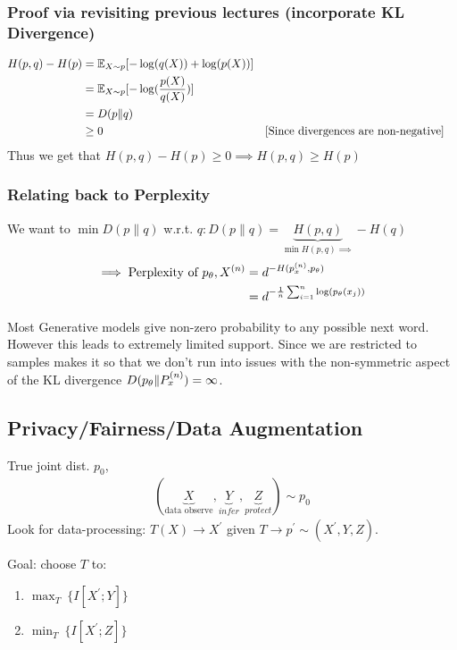 \subsubsection{Proof via revisiting previous lectures (incorporate KL Divergence)}
\begin{align*}
    H(p, q) - H(p) 
    &= \mathbb{E}_{X\sim p}[-\log(q(X)) + \log(p(X))]
    \\
    &= \mathbb{E}_{X\sim p}[-\log(\frac{p(X)}{q(X)})]
    \\
    &= D(p\| q)
    \\
    &\geq0 &&[\text{Since divergences are non-negative}]
\end{align*}
Thus we get that 
$    H(p, q) - H(p) 
\geq 0 \implies
    H(p, q) \geq H(p) 
$
\subsubsection{Relating back to Perplexity}
We want to $\min D(p\|q)$ w.r.t. $q: D(p\| q)=\underbrace{H(p, q)}_{\min H(p, q)\implies}-H(q)$
\begin{align*}
\implies \text{Perplexity of $p_\theta, X^{(n)}$} 
    &= d^{-H(p_x^{(n)}, p_\theta)} 
    \\
    &= d^{-\frac1n \sum_{i=1}^n \log(p_\theta (x_j))}
\end{align*}

Most Generative models give non-zero probability to any possible next word. However this leads to extremely limited support. Since we are restricted to samples makes it so that we don't run into issues with the non-symmetric aspect of the KL divergence $D(p_\theta\|P_x^{(n)})=\infty$.

\subsection{Privacy/Fairness/Data Augmentation}
True joint dist. $p_0$,
\begin{align*}
    (\underbrace{X}_{\text{data observe}}, \underbrace{Y}_{infer}, \underbrace{Z}_{protect}) \sim p_0
\end{align*}
Look for data-processing: $T(X)\to X^\prime$ given $T\to p^\prime\sim (X^\prime, Y, Z)$.

Goal: choose $T$ to:
\begin{enumerate}
    \item $\displaystyle\max_T\  \{I[X^\prime; Y]\}$
    \item $\displaystyle\min_T\  \{I[X^\prime; Z]\}$
\end{enumerate}
